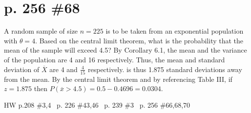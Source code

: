 \documentclass[12pt]{article}
\begin{document}
	\section[20pt]{p. 256 \#68}
	A random sample of size \(n=225\) is to be taken from an exponential population with \(\theta=4\). Based on the central limit theorem, what is the probability that the mean of the sample will exceed 4.5? \newline \newline
	By Corollary 6.1, the mean and the variance of the population are 4 and 16 respectively. \newline
	Thus, the mean and standard deviation of \(\overline{X}\) are 4 and \(\frac{4}{15}\) respectively. \newline
	 is thus 1.875 standard deviations away from the mean.
	\newline
	By the central limit theorem and by 
	referencing Table III, if \(z=1.875\) then \(P(\overline{x}>4.5)=0.5-0.4696=0.0304\).
	\newline \newline
	\newpage
	\maketitle HW p.208 \#3,4 \ p. 226 \#43,46 \ p. 239 \#3 \ p. 256 \#66,68,70
\end{document}
